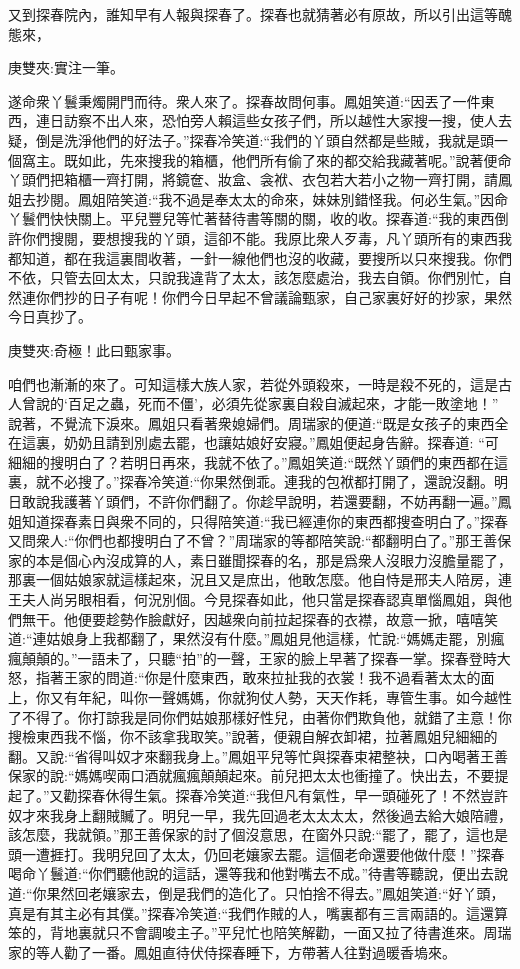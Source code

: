 \begin{parag}
    又到探春院內，誰知早有人報與探春了。探春也就猜著必有原故，所以引出這等醜態來，\begin{note}庚雙夾:實注一筆。\end{note}遂命衆丫鬟秉燭開門而待。衆人來了。探春故問何事。鳳姐笑道:“因丟了一件東西，連日訪察不出人來，恐怕旁人賴這些女孩子們，所以越性大家搜一搜，使人去疑，倒是洗淨他們的好法子。”探春冷笑道:“我們的丫頭自然都是些賊，我就是頭一個窩主。既如此，先來搜我的箱櫃，他們所有偷了來的都交給我藏著呢。”說著便命丫頭們把箱櫃一齊打開，將鏡奩、妝盒、衾袱、衣包若大若小之物一齊打開，請鳳姐去抄閱。鳳姐陪笑道:“我不過是奉太太的命來，妹妹別錯怪我。何必生氣。”因命丫鬟們快快關上。平兒豐兒等忙著替待書等關的關，收的收。探春道:“我的東西倒許你們搜閱，要想搜我的丫頭，這卻不能。我原比衆人歹毒，凡丫頭所有的東西我都知道，都在我這裏間收著，一針一線他們也沒的收藏，要搜所以只來搜我。你們不依，只管去回太太，只說我違背了太太，該怎麼處治，我去自領。你們別忙，自然連你們抄的日子有呢！你們今日早起不曾議論甄家，自己家裏好好的抄家，果然今日真抄了。\begin{note}庚雙夾:奇極！此曰甄家事。\end{note}咱們也漸漸的來了。可知這樣大族人家，若從外頭殺來，一時是殺不死的，這是古人曾說的‘百足之蟲，死而不僵’，必須先從家裏自殺自滅起來，才能一敗塗地！” 說著，不覺流下淚來。鳳姐只看著衆媳婦們。周瑞家的便道:“既是女孩子的東西全在這裏，奶奶且請到別處去罷，也讓姑娘好安寢。”鳳姐便起身告辭。探春道: “可細細的搜明白了？若明日再來，我就不依了。”鳳姐笑道:“既然丫頭們的東西都在這裏，就不必搜了。”探春冷笑道:“你果然倒乖。連我的包袱都打開了，還說沒翻。明日敢說我護著丫頭們，不許你們翻了。你趁早說明，若還要翻，不妨再翻一遍。”鳳姐知道探春素日與衆不同的，只得陪笑道:“我已經連你的東西都搜查明白了。”探春又問衆人:“你們也都搜明白了不曾？”周瑞家的等都陪笑說:“都翻明白了。”那王善保家的本是個心內沒成算的人，素日雖聞探春的名，那是爲衆人沒眼力沒膽量罷了，那裏一個姑娘家就這樣起來，況且又是庶出，他敢怎麼。他自恃是邢夫人陪房，連王夫人尚另眼相看，何況別個。今見探春如此，他只當是探春認真單惱鳳姐，與他們無干。他便要趁勢作臉獻好，因越衆向前拉起探春的衣襟，故意一掀，嘻嘻笑道:“連姑娘身上我都翻了，果然沒有什麼。”鳳姐見他這樣，忙說:“媽媽走罷，別瘋瘋顛顛的。”一語未了，只聽“拍”的一聲，王家的臉上早著了探春一掌。探春登時大怒，指著王家的問道:“你是什麼東西，敢來拉扯我的衣裳！我不過看著太太的面上，你又有年紀，叫你一聲媽媽，你就狗仗人勢，天天作耗，專管生事。如今越性了不得了。你打諒我是同你們姑娘那樣好性兒，由著你們欺負他，就錯了主意！你搜檢東西我不惱，你不該拿我取笑。”說著，便親自解衣卸裙，拉著鳳姐兒細細的翻。又說:“省得叫奴才來翻我身上。”鳳姐平兒等忙與探春束裙整袂，口內喝著王善保家的說:“媽媽喫兩口酒就瘋瘋顛顛起來。前兒把太太也衝撞了。快出去，不要提起了。”又勸探春休得生氣。探春冷笑道:“我但凡有氣性，早一頭碰死了！不然豈許奴才來我身上翻賊贓了。明兒一早，我先回過老太太太太，然後過去給大娘陪禮，該怎麼，我就領。”那王善保家的討了個沒意思，在窗外只說:“罷了，罷了，這也是頭一遭捱打。我明兒回了太太，仍回老孃家去罷。這個老命還要他做什麼！”探春喝命丫鬟道:“你們聽他說的這話，還等我和他對嘴去不成。”待書等聽說，便出去說道:“你果然回老孃家去，倒是我們的造化了。只怕捨不得去。”鳳姐笑道:“好丫頭，真是有其主必有其僕。”探春冷笑道:“我們作賊的人，嘴裏都有三言兩語的。這還算笨的，背地裏就只不會調唆主子。”平兒忙也陪笑解勸，一面又拉了待書進來。周瑞家的等人勸了一番。鳳姐直待伏侍探春睡下，方帶著人往對過暖香塢來。

\end{parag}
